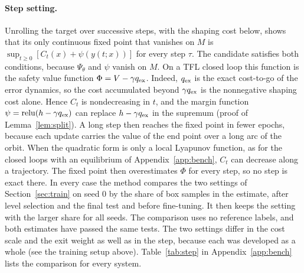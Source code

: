 \paragraph{Step setting.} Unrolling the target over successive steps, with the shaping cost below, shows that its only continuous fixed point that vanishes on $M$ is $\sup_{t\ge0}[C_t(x)+\psi(y(t;x))]$ for every step $\tau$. The candidate satisfies both conditions, because $\Psi_\theta$ and $\psi$ vanish on $M$. On a TFL closed loop this function is the safety value function $\Phi=V-\gamma q_{\mathrm{ex}}$. Indeed, $q_{\mathrm{ex}}$ is the exact cost-to-go of the error dynamics, so the cost accumulated beyond $\gamma q_{\mathrm{ex}}$ is the nonnegative shaping cost alone. Hence $C_t$ is nondecreasing in $t$, and the margin function $\psi=\operatorname{relu}(h-\gamma q_{\mathrm{ex}})$ can replace $h-\gamma q_{\mathrm{ex}}$ in the supremum (proof of Lemma~\ref{lem:split}). A long step then reaches the fixed point in fewer epochs, because each update carries the value of the end point over a long arc of the orbit. When the quadratic form is only a local Lyapunov function, as for the closed loops with an equilibrium of Appendix~\ref{app:bench}, $C_t$ can decrease along a trajectory. The fixed point then overestimates $\Phi$ for every step, so no step is exact there. In every case the method compares the two settings of Section~\ref{sec:train} on seed 0 by the share of box samples in the estimate, after level selection and the final test and before fine-tuning. It then keeps the setting with the larger share for all seeds. The comparison uses no reference labels, and both estimates have passed the same tests. The two settings differ in the cost scale and the exit weight as well as in the step, because each was developed as a whole (see the training setup above). Table~\ref{tab:step} in Appendix~\ref{app:bench} lists the comparison for every system.

